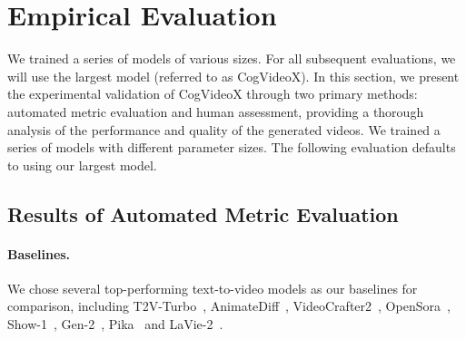\section{Empirical Evaluation}
We trained a series of models of various sizes. For all subsequent evaluations, we will use the largest model (referred to as CogVideoX).
In this section, we present the experimental validation of CogVideoX through two primary methods: automated metric evaluation and human assessment, providing a thorough analysis of the performance and quality of the generated videos. 
We trained a series of models with different parameter sizes. The following evaluation defaults to using our largest model.

\subsection{Results of Automated Metric Evaluation} 

\paragraph{Baselines.} We chose several top-performing text-to-video models as our baselines for comparison, including T2V-Turbo~\citep{li2024t2v}, AnimateDiff~\citep{guo2023animatediff}, VideoCrafter2~\citep{chen2024videocrafter2}, OpenSora~\citep{opensora}, Show-1~\citep{zhang2023show}, Gen-2~\citep{gen2}, Pika~\citep{pika} and LaVie-2~\citep{wang2023lavie}.



